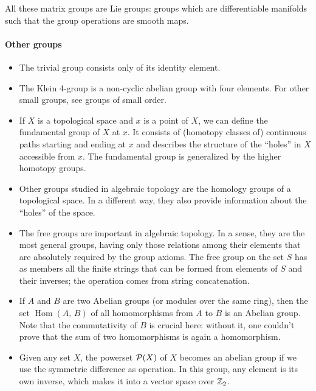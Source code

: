 \documentclass[12pt]{article}
\begin{document}
\begin{itemize}
All these matrix groups are Lie groups: groups which are differentiable manifolds
such that the group operations are smooth maps.

\end{itemize}

\paragraph{Other groups}

\begin{itemize}

\item The trivial group consists only of its identity element.

\item The Klein 4-group is a non-cyclic abelian group with four elements. For other small groups, see groups of small order.

\item If $X$ is a topological space and $x$ is a point of $X$, we can
define the fundamental group of $X$ at $x$. It consists of
(homotopy classes of) continuous
paths starting and ending at $x$ and describes the structure
of the ``holes'' in $X$ accessible from $x$. The fundamental group is generalized by the higher homotopy groups.

\item Other groups studied in algebraic topology are the homology groups of a topological space. In a different way, they also provide information about the ``holes'' of the space.

\item The free groups are important in algebraic topology. In a sense,
they are the most general groups, having only those relations among
their elements that are absolutely required by the group axioms. The free group on the set $S$ has as members all the finite strings that can be formed from elements of $S$ and their inverses; the operation comes from string concatenation.

\item If $A$ and $B$ are two Abelian groups (or modules over the same ring), then the set $\operatorname{Hom}(A,\,B)$ of all homomorphisms from $A$ to $B$ is an Abelian group. Note that the commutativity of $B$ is crucial here: without it, one couldn't prove that the sum of two homomorphisms is again a homomorphism.

\item Given any set $X$, the powerset ${\cal P}(X)$ of $X$ becomes an abelian group if we use the symmetric difference as operation. In this group, any element is its own inverse, which makes it into a vector space over $\Bbb{Z}_2$.


\end{itemize}
\end{document}
